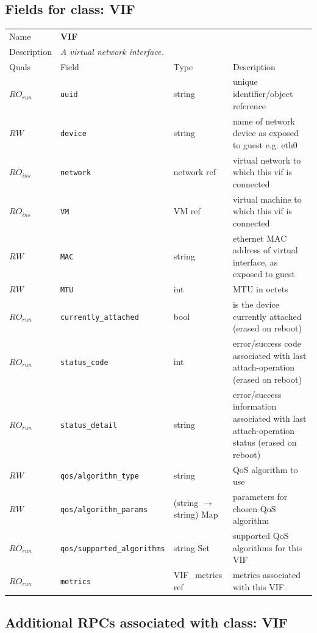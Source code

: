 \subsection{Fields for class: VIF}
\begin{longtable}{|lllp{}|}
\hline
\multicolumn{1}{|l}{Name} & \multicolumn{3}{l|}{\bf VIF} \\
\multicolumn{1}{|l}{Description} & \multicolumn{3}{l|}{\parbox{11cm}{\em A
virtual network interface.}} \\
\hline
Quals & Field & Type & Description \\
\hline
$\mathit{RO}_\mathit{run}$ &  {\tt uuid} & string & unique identifier/object reference \\
$\mathit{RW}$ &  {\tt device} & string & name of network device as exposed to guest e.g. eth0 \\
$\mathit{RO}_\mathit{ins}$ &  {\tt network} & network ref & virtual network to which this vif is connected \\
$\mathit{RO}_\mathit{ins}$ &  {\tt VM} & VM ref & virtual machine to which this vif is connected \\
$\mathit{RW}$ &  {\tt MAC} & string & ethernet MAC address of virtual interface, as exposed to guest \\
$\mathit{RW}$ &  {\tt MTU} & int & MTU in octets \\
$\mathit{RO}_\mathit{run}$ &  {\tt currently\_attached} & bool & is the device currently attached (erased on reboot) \\
$\mathit{RO}_\mathit{run}$ &  {\tt status\_code} & int & error/success code associated with last attach-operation (erased on reboot) \\
$\mathit{RO}_\mathit{run}$ &  {\tt status\_detail} & string & error/success information associated with last attach-operation status (erased on reboot) \\
$\mathit{RW}$ &  {\tt qos/algorithm\_type} & string & QoS algorithm to use \\
$\mathit{RW}$ &  {\tt qos/algorithm\_params} & (string $\rightarrow$ string) Map & parameters for chosen QoS algorithm \\
$\mathit{RO}_\mathit{run}$ &  {\tt qos/supported\_algorithms} & string Set & supported QoS algorithms for this VIF \\
$\mathit{RO}_\mathit{run}$ &  {\tt metrics} & VIF\_metrics ref & metrics associated with this VIF. \\
\hline
\end{longtable}
\subsection{Additional RPCs associated with class: VIF}
